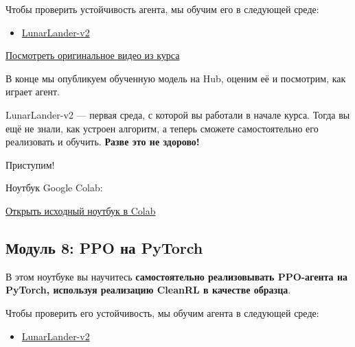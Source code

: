 \documentclass[11pt,a4paper]{article}
\begin{document}
Чтобы проверить устойчивость агента, мы обучим его в следующей среде:

\begin{itemize}
\tightlist
\item
  \href{https://www.gymlibrary.ml/environments/box2d/lunar_lander/}{LunarLander-v2}
\end{itemize}

\href{https://github.com/huggingface/deep-rl-class/blob/main/assets/63_deep_rl_intro/lunarlander.mp4}{Посмотреть оригинальное видео из курса}

В конце мы опубликуем обученную модель на Hub, оценим её и посмотрим, как играет агент.

LunarLander-v2 --- первая среда, с которой вы работали в начале курса. Тогда вы ещё не знали, как устроен алгоритм, а теперь сможете самостоятельно его реализовать и обучить. \textbf{Разве это не здорово!}


Приступим!

Ноутбук Google Colab:

\href{https://colab.research.google.com/github/huggingface/deep-rl-class/blob/master/notebooks/unit8/unit8_part1.ipynb}{Открыть исходный ноутбук в Colab}

\subsection{Модуль 8: PPO на PyTorch}\label{unit-8-proximal-policy-gradient-ppo-with-pytorch}


В этом ноутбуке вы научитесь \textbf{самостоятельно реализовывать PPO-агента на PyTorch, используя реализацию CleanRL в качестве образца}.

Чтобы проверить его устойчивость, мы обучим агента в следующей среде:

\begin{itemize}
\tightlist
\item
  \href{https://www.gymlibrary.dev/environments/box2d/lunar_lander/}{LunarLander-v2}
\end{itemize}
\end{document}
